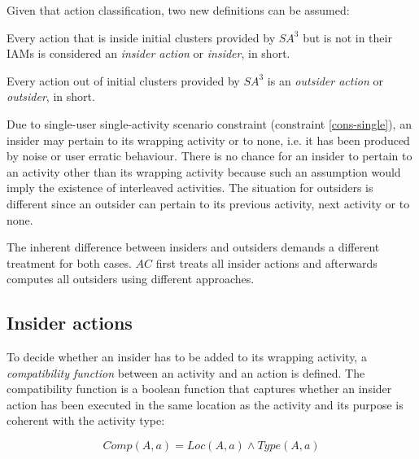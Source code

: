 Given that action classification, two new definitions can be assumed:

\begin{defn}
\label{def-insider}
 Every action that is inside initial clusters provided by $SA^3$ but is not in their IAMs is considered an \textit{insider action} or \textit{insider}, in short.
\end{defn}

\begin{defn}
\label{def-outsider}
 Every action out of initial clusters provided by $SA^3$ is an \textit{outsider action} or \textit{outsider}, in short.
\end{defn}

Due to single-user single-activity scenario constraint (constraint \ref{cons-single}), an insider may pertain to its wrapping activity or to none, i.e. it has been produced by noise or user erratic behaviour. There is no chance for an insider to pertain to an activity other than its wrapping activity because such an assumption would imply the existence of interleaved activities. The situation for outsiders is different since an outsider can pertain to its previous activity, next activity or to none. 

The inherent difference between insiders and outsiders demands a different treatment for both cases. $AC$ first treats all insider actions and afterwards computes all outsiders using different approaches.

\subsection{Insider actions}
To decide whether an insider has to be added to its wrapping activity, a \textit{compatibility function} between an activity and an action is defined. The compatibility function is a boolean function that captures whether an insider action has been executed in the same location as the activity and its purpose is coherent with the activity type:

\begin{equation}
\label{eq-comp}
 Comp(A, a) = Loc(A, a) \wedge Type(A, a)
\end{equation}

